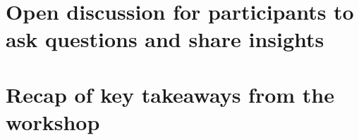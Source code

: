 \documentclass[
]{book}
\begin{document}
\hypertarget{open-discussion-for-participants-to-ask-questions-and-share-insights}{%
\section*{Open discussion for participants to ask questions and share insights}\label{open-discussion-for-participants-to-ask-questions-and-share-insights}}

\hypertarget{recap-of-key-takeaways-from-the-workshop}{%
\section*{Recap of key takeaways from the workshop}\label{recap-of-key-takeaways-from-the-workshop}}

  
\end{document}
